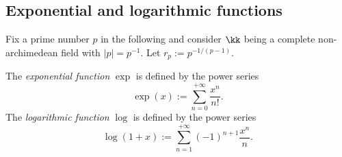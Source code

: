 
\subsection{Exponential and logarithmic functions}

    Fix a prime number \(p\) in the following and consider \(\kk\) being a complete non-archimedean field with \(|p| = p^{-1}\).
    Let \(r_p := p^{-1/(p-1)}\).

    \begin{construction}\label{constr:exponential_and_logarithmic_functions}
        The \emph{exponential function} \(\exp\) is defined by the power series
        \[ \exp(x) := \sum_{n=0}^{+\infty} \frac{x^n}{n!}. \]
        The \emph{logarithmic function} \(\log\) is defined by the power series
        \[ \log(1+x) := \sum_{n=1}^{+\infty} (-1)^{n+1} \frac{x^n}{n}. \]
    \end{construction}



